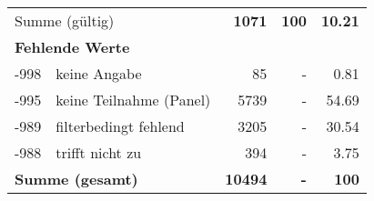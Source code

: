 \begin{longtable}{lXrrr}
     \midrule
     \multicolumn{2}{l}{Summe (gültig)} &
       \textbf{\num{1071}} &
     \textbf{100} &
       \textbf{\num[round-mode=places,round-precision=2]{10,21}} \\
     \multicolumn{5}{l}{\textbf{Fehlende Werte}}\\
       -998 &
       keine Angabe &
         \num{85} &
        - &
         \num[round-mode=places,round-precision=2]{0,81} \\
       -995 &
       keine Teilnahme (Panel) &
         \num{5739} &
        - &
         \num[round-mode=places,round-precision=2]{54,69} \\
       -989 &
       filterbedingt fehlend &
         \num{3205} &
        - &
         \num[round-mode=places,round-precision=2]{30,54} \\
       -988 &
       trifft nicht zu &
         \num{394} &
        - &
         \num[round-mode=places,round-precision=2]{3,75} \\
     \midrule
     \multicolumn{2}{l}{\textbf{Summe (gesamt)}} &
          \textbf{\num{10494}} &
        \textbf{-} &
        \textbf{100} \\
     \bottomrule
     \end{longtable}
     
